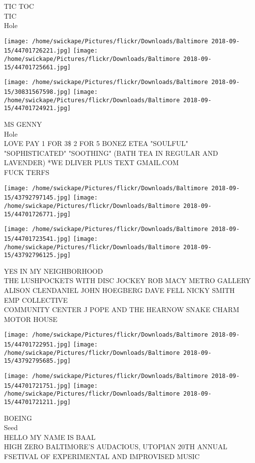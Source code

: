 \documentclass[10pt,letterpaper]{article}
\begin{document}
TIC TOC\\
TIC\\
Hole
\pagebreak

\texttt{[image: /home/swickape/Pictures/flickr/Downloads/Baltimore 2018-09-15/44701726221.jpg]}
\texttt{[image: /home/swickape/Pictures/flickr/Downloads/Baltimore 2018-09-15/44701725661.jpg]}

\texttt{[image: /home/swickape/Pictures/flickr/Downloads/Baltimore 2018-09-15/30831567598.jpg]}
\texttt{[image: /home/swickape/Pictures/flickr/Downloads/Baltimore 2018-09-15/44701724921.jpg]}

MS GENNY\\
Hole\\
LOVE PAY 1 FOR 3\$ 2 FOR 5 BONEZ ETEA "SOULFUL" "SOPHISTICATED" "SOOTHING" (BATH TEA IN REGULAR AND LAVENDER) *WE DLIVER PLUS TEXT GMAIL.COM\\
FUCK TERFS
\pagebreak

\texttt{[image: /home/swickape/Pictures/flickr/Downloads/Baltimore 2018-09-15/43792797145.jpg]}
\texttt{[image: /home/swickape/Pictures/flickr/Downloads/Baltimore 2018-09-15/44701726771.jpg]}

\texttt{[image: /home/swickape/Pictures/flickr/Downloads/Baltimore 2018-09-15/44701723541.jpg]}
\texttt{[image: /home/swickape/Pictures/flickr/Downloads/Baltimore 2018-09-15/43792796125.jpg]}

YES IN MY NEIGHBORHOOD\\
THE LUSHPOCKETS WITH DISC JOCKEY ROB MACY METRO GALLERY\\
ALISON CLENDANIEL JOHN HOEGBERG DAVE FELL NICKY SMITH EMP COLLECTIVE\\
COMMUNITY CENTER J POPE AND THE HEARNOW SNAKE CHARM MOTOR HOUSE
\pagebreak

\texttt{[image: /home/swickape/Pictures/flickr/Downloads/Baltimore 2018-09-15/44701722951.jpg]}
\texttt{[image: /home/swickape/Pictures/flickr/Downloads/Baltimore 2018-09-15/43792795685.jpg]}

\texttt{[image: /home/swickape/Pictures/flickr/Downloads/Baltimore 2018-09-15/44701721751.jpg]}
\texttt{[image: /home/swickape/Pictures/flickr/Downloads/Baltimore 2018-09-15/44701721211.jpg]}

BOEING\\
Seed\\
HELLO MY NAME IS BAAL\\
HIGH ZERO BALTIMORE'S AUDACIOUS, UTOPIAN 20TH ANNUAL FSETIVAL OF EXPERIMENTAL AND IMPROVISED MUSIC
\pagebreak
\end{document}
